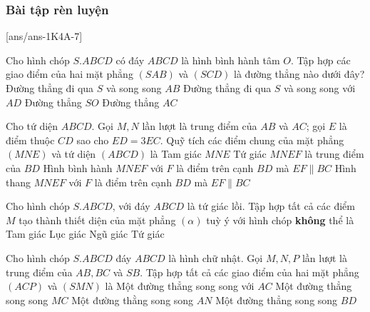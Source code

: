 \subsubsection{Bài tập rèn luyện}
\centerline{}
[ans/ans-1K4A-7]
\begin{ex}%
	Cho hình chóp $S.ABCD$ có đáy $ABCD$ là hình bình hành tâm $O$. Tập hợp các giao điểm của hai mặt phẳng $(SAB)$ và $(SCD)$ là đường thẳng nào dưới đây?
	\choice
	{\True Đường thẳng đi qua $S$ và song song $AB$}
	{ Đường thẳng đi qua $S$ và song song với $AD$}
	{ Đường thẳng $SO$}
	{ Đường thẳng $AC$}
	\loigiai{
		
	}
\end{ex}
\begin{ex}%
	Cho tứ diện $ABCD$. Gọi $M,N$ lần lượt là trung điểm của $AB$ và $AC$; gọi $E$ là điểm thuộc $ CD $ sao cho $ ED=3EC $. Quỹ tích các điểm chung của mặt phẳng $ (MNE) $ và tứ diện $(ABCD)$ là
	\choice
	{ Tam giác $ MNE $}		
	{ Tứ giác $ MNEF $ là trung điểm của $ BD $}
	{ Hình bình hành $ MNEF $ với $ F $ là điểm trên cạnh $ BD $ mà $ EF \parallel BC $}
	{\True Hình thang $ MNEF $ với $ F $ là điểm trên cạnh $ BD $ mà $ EF \parallel BC $}
\end{ex}
\begin{ex}%
	Cho hình chóp $S.ABCD$, với đáy $ABCD$ là tứ giác lồi. Tập hợp tất cả các điểm $ M $ tạo thành thiết diện của mặt phẳng $( \alpha )$ tuỳ ý với hình chóp \textbf{không} thể là
	\choice
	{ Tam giác}
	{\True Lục giác}
	{ Ngũ giác}
	{ Tứ giác}
	\loigiai{
		
	}
\end{ex}
\begin{ex}%
	Cho hình chóp $S.ABCD$ đáy $ABCD$ là hình chữ nhật. Gọi $M,N,P$ lần lượt là trung điểm của $ AB, BC $ và $ SB $. Tập hợp tất cả các giao điểm của hai mặt phẳng $ (ACP) $ và $ (SMN) $ là
	\choice
	{\True Một đường thẳng song song với $ AC $}
	{ Một đường thẳng song song $ MC $}
	{ Một đường thằng song song $ AN $}
	{ Một đường thẳng song song $ BD $}
\end{ex}
